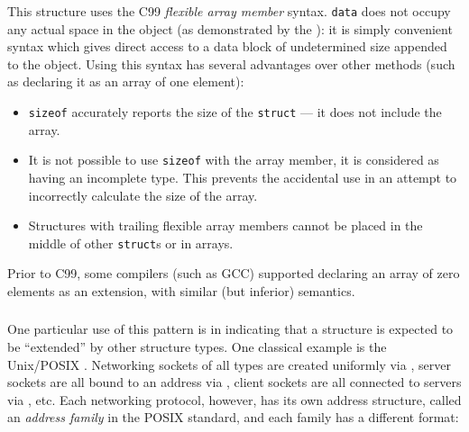 \begin{figure}[ht]
    
\end{figure}
\vspace{-\baselineskip}

\begin{aside}
    This structure uses the C99 \textit{flexible array member} syntax.
    \texttt{data} does not occupy any actual space in the object (as
    demonstrated by the ): it is simply convenient syntax
    which gives direct access to a data block of undetermined size appended to
    the object.  Using this syntax has several advantages over other methods
    (such as declaring it as an array of one element\footnotemark):
    \begin{itemize}
        \item
            \texttt{sizeof} accurately reports the size of the \texttt{struct}
            --- it does not include the array.
        \item
            It is not possible to use \texttt{sizeof} with the array member, it
            is considered as having an incomplete type.  This prevents the
            accidental use in an attempt to incorrectly calculate the size of
            the array.
        \item
            Structures with trailing flexible array members cannot be placed in
            the middle of other \texttt{struct}s or in arrays.
    \end{itemize}
    Prior to C99, some compilers (such as GCC) supported declaring an array of
    zero elements as an extension, with similar (but inferior) semantics.
\end{aside}


\subsubsection{}

One particular use of this pattern is in indicating that a structure is expected
to be ``extended'' by other structure types\footnotemark.  One classical example
is the Unix/POSIX .  Networking sockets of all types are
created uniformly via , server sockets are all bound to an
address via , client sockets are all connected to servers via
, etc.  Each networking protocol, however, has its own address
structure, called an \textit{address family} in the POSIX standard, and each
family has a different format:

